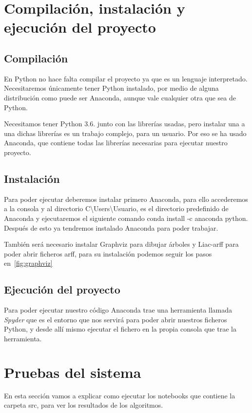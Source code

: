 \section{Compilación, instalación y ejecución del proyecto}
\subsection{Compilación}
En Python no hace falta compilar el proyecto ya que es un lenguaje interpretado. Necesitaremos únicamente tener Python instalado, por medio de alguna distribución como puede ser Anaconda, aunque vale cualquier otra que sea de Python.

Necesitamos tener Python 3.6. junto con las librerías usadas, pero instalar una a una dichas librerías es un trabajo complejo, para un usuario. Por eso se ha usado Anaconda, que contiene todas las librerías necesarias para ejecutar nuestro proyecto.

\subsection{Instalación}
Para poder ejecutar deberemos instalar primero Anaconda, para ello accederemos a la consola y al directorio \textrm{C\textbackslash Users\textbackslash Usuario}, es el directorio predefinido de Anaconda y ejecutaremos el siguiente comando \textrm{conda install -c anaconda python}. Después de esto ya tendremos instalado Anaconda para poder trabajar.

También será necesario instalar Graphviz para dibujar árboles y Liac-arff para poder abrir ficheros arff, para su instalación podemos seguir los pasos en~\ref{fig:graphviz}

\subsection{Ejecución del proyecto}
Para poder ejecutar nuestro código Anaconda trae una herramienta llamada \textit{Spyder} que es el entorno que nos servirá para poder abrir nuestros ficheros Python, y desde allí mismo ejecutar el fichero en la propia consola que trae la herramienta.

\section{Pruebas del sistema}
En esta sección vamos a explicar como ejecutar los notebooks que contiene la carpeta src, para ver los resultados de los algoritmos. 

